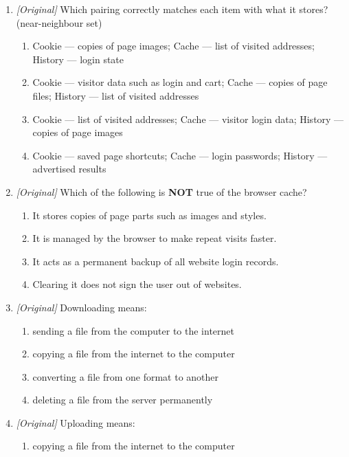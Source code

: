 \documentclass[11pt]{article}
\begin{document}
\begin{enumerate}[label=\textbf{Q\arabic*.}, leftmargin=*]
\begin{enumerate}[label=\Alph*.]
    \item login names and passwords for every website
  \end{enumerate}
\item \textit{[Original]} Which pairing correctly matches each item with what
  it stores? (near-neighbour set)
  \begin{enumerate}[label=\Alph*.]
    \item Cookie --- copies of page images; Cache --- list of visited addresses; History --- login state
    \item Cookie --- visitor data such as login and cart; Cache --- copies of page files; History --- list of visited addresses
    \item Cookie --- list of visited addresses; Cache --- visitor login data; History --- copies of page images
    \item Cookie --- saved page shortcuts; Cache --- login passwords; History --- advertised results
  \end{enumerate}
\item \textit{[Original]} Which of the following is \textbf{NOT} true of the
  browser cache?
  \begin{enumerate}[label=\Alph*.]
    \item It stores copies of page parts such as images and styles.
    \item It is managed by the browser to make repeat visits faster.
    \item It acts as a permanent backup of all website login records.
    \item Clearing it does not sign the user out of websites.
  \end{enumerate}
\item \textit{[Original]} Downloading means:
  \begin{enumerate}[label=\Alph*.]
    \item sending a file from the computer to the internet
    \item copying a file from the internet to the computer
    \item converting a file from one format to another
    \item deleting a file from the server permanently
  \end{enumerate}
\item \textit{[Original]} Uploading means:
  \begin{enumerate}[label=\Alph*.]
    \item copying a file from the internet to the computer

\end{enumerate}
\end{enumerate}
\end{document}
